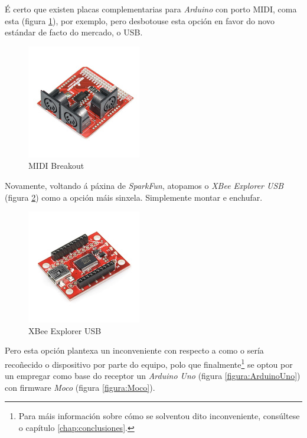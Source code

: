   É certo que existen placas complementarias para \textit{Arduino} con porto
  MIDI, coma esta \cite{SparkFunMIDI} (figura \ref{figura:SparkFunMIDI}), por
  exemplo, pero desbotouse esta opción en favor do novo estándar de facto do
  mercado, o USB. \\

  \begin{figure}[htbp]
   \centering
   \includegraphics[scale=3.0,keepaspectratio=true]{./imagenes/sparkfun-midi.jpg}
   \caption{MIDI Breakout}
   \label{figura:SparkFunMIDI}
  \end{figure}

  Novamente, voltando á páxina de \textit{SparkFun}, atopamos o
  \textit{XBee Explorer USB} \cite{XBeeExplorer} (figura
  \ref{figura:XBeeExplorer}) como a opción máis sinxela. Simplemente montar e
   enchufar. \\

  \begin{figure}[htbp]
   \centering
   \includegraphics[scale=3.0,keepaspectratio=true]{./imagenes/xbee-explorer.jpg}
   \caption{XBee Explorer USB}
   \label{figura:XBeeExplorer}
  \end{figure}

  Pero esta opción plantexa un inconveniente con respecto a como o sería
  recoñecido o dispositivo por parte do equipo, polo que
  finalmente\footnote{Para máis información sobre cómo se solventou dito
  inconveniente, consúltese o capítulo \ref{chap:conclusiones}.} se optou
  por un empregar como base do receptor un \textit{Arduino Uno} (figura
  \ref{figura:ArduinoUno}) con firmware \textit{Moco} (figura
  \ref{figura:Moco}). \\

